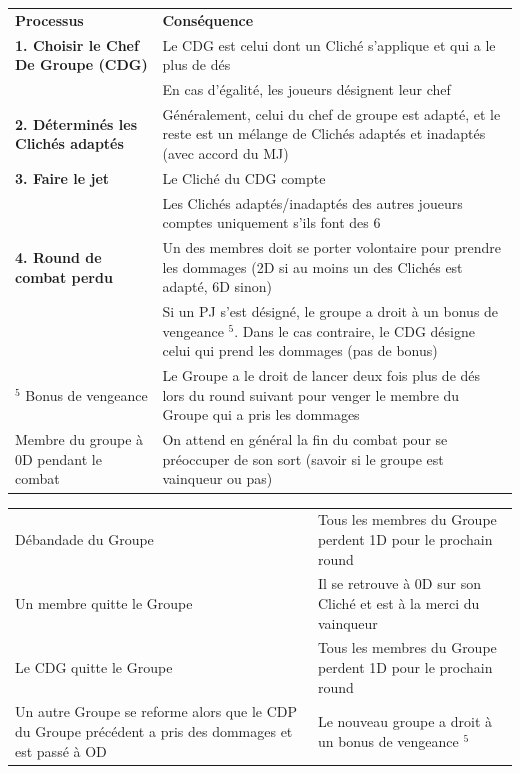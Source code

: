 \begin{frame}[t]
{\begin{tabular}{>{\raggedright\arraybackslash}p{2.5cm}p{5.6cm}}
\textbf{Processus} & \textbf{Conséquence} \\
\textbf{1. Choisir le Chef De Groupe (CDG)} & Le CDG est celui dont un Cliché s'applique et qui a le plus de dés \\
                                   & En cas d'égalité, les joueurs désignent leur chef \\
\textbf{2. Déterminés les Clichés adaptés}  & Généralement, celui du chef de groupe est adapté, et le reste est un mélange de Clichés adaptés et inadaptés (avec accord du MJ) \\
\textbf{3. Faire le jet} & Le Cliché du CDG compte \\
   & Les Clichés adaptés/inadaptés des autres joueurs comptes uniquement s'ils font des 6 \\
\textbf{4. Round de combat perdu} & Un des membres doit se porter volontaire pour prendre les dommages (2D si au moins un des Clichés est adapté, 6D sinon) \\
   & Si un PJ s'est désigné, le groupe a droit à un bonus de vengeance $^{5}$. Dans le cas contraire, le CDG désigne celui qui prend les dommages (pas de bonus) \\
$^{5}$ Bonus de vengeance & Le Groupe a le droit de lancer deux fois plus de dés lors du round suivant pour venger le membre du Groupe qui a pris les dommages \\
Membre du groupe à 0D pendant le combat &  On attend en général la fin du combat pour se préoccuper de son sort (savoir si le groupe est vainqueur ou pas) \\
\end{tabular}

\vspace{0.2cm}


\vspace{0.2cm}

\begin{tabular}{>{\raggedright\arraybackslash}p{4.05cm}p{4.05cm}}
Débandade du Groupe & Tous les membres du Groupe perdent 1D pour le prochain round \\
Un membre quitte le Groupe & Il se retrouve à 0D sur son Cliché et est à la merci du vainqueur \\
Le CDG quitte le Groupe & Tous les membres du Groupe perdent 1D pour le prochain round \\
Un autre Groupe se reforme alors que le CDP du Groupe précédent a pris des dommages et est passé à OD & Le nouveau groupe a droit à un bonus de vengeance $^{5}$ \\
\end{tabular}

}
\end{frame}
